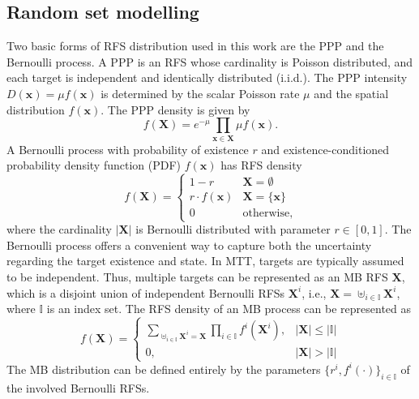 \documentclass[conference]{IEEEtran}
\begin{document}
\subsection{Random set modelling}
Two basic forms of RFS distribution used in this work are the PPP and the Bernoulli process. A PPP is an RFS whose cardinality is Poisson distributed, and each target is independent and identically distributed (i.i.d.). The PPP intensity $D(\mathbf{x})=\mu f(\mathbf{x})$ is determined by the scalar Poisson rate $\mu$ and the spatial distribution $f(\mathbf{x})$. The PPP density is given by
\begin{equation}
f(\mathbf{X}) = e^{-\mu}\prod_{\mathbf{x}\in\mathbf{X}}\mu f(\mathbf{x}).
\label{eq:ppp}
\end{equation}
A Bernoulli process with probability of existence $r$ and existence-conditioned probability density function (PDF) $f(\mathbf{x})$ has RFS density
\begin{equation}
f(\mathbf{X}) = \begin{cases}
    1-r& \mathbf{X}=\emptyset\\
    r\cdot f(\mathbf{x})& \mathbf{X}=\{\mathbf{x}\}\\
    0& \text{otherwise},
\end{cases}
\label{eq:bernoulli}
\end{equation}
where the cardinality $|\mathbf{X}|$ is Bernoulli distributed with parameter $r\in[0,1]$. The Bernoulli process offers a convenient way to capture both the uncertainty regarding the target existence and state. In MTT, targets are typically assumed to be independent. Thus, multiple targets can be represented as an MB RFS $\mathbf{X}$, which is a disjoint union of independent Bernoulli RFSs $\mathbf{X}^i$, i.e., $\mathbf{X}=\uplus_{i\in\mathbb{I}} \mathbf{X}^i$, where $\mathbb{I}$ is an index set. The RFS density of an MB process can be represented as 
\begin{equation}
f(\mathbf{X}) = 
\begin{cases}
\sum_{\uplus_{i\in\mathbb{I}}\mathbf{X}^i=\mathbf{X}}\prod_{i\in\mathbb{I}}f^i(\mathbf{X}^i), & |\mathbf{X}| \leq |\mathbb{I}| \\
0, & |\mathbf{X}| > |\mathbb{I}|
\end{cases}
\end{equation}
The MB distribution can be defined entirely by the parameters $\{r^i,f^i(\cdot)\}_{i\in\mathbb{I}}$ of the involved Bernoulli RFSs.
\end{document}
